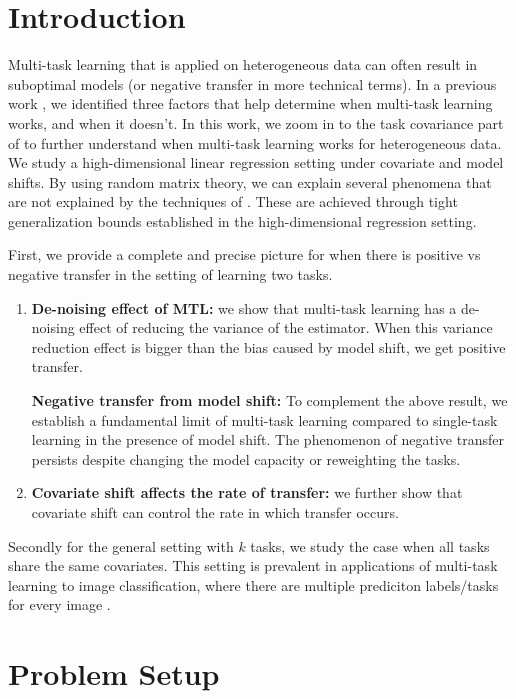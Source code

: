 \section{Introduction}

Multi-task learning that is applied on heterogeneous data can often result in suboptimal models (or negative transfer in more technical terms).
In a previous work \cite{WZR20}, we identified three factors that help determine when multi-task learning works, and when it doesn't.
In this work, we zoom in to the task covariance part of \cite{WZR20} to further understand when multi-task learning works for heterogeneous data.
We study a high-dimensional linear regression setting under covariate and model shifts.
By using random matrix theory, we can explain several phenomena that are not explained by the techniques of \cite{WZR20}.
These are achieved through tight generalization bounds established in the high-dimensional regression setting.

First, we provide a complete and precise picture for when there is positive vs negative transfer in the setting of learning two tasks.
\begin{enumerate}
	\item {\bf De-noising effect of MTL:} we show that multi-task learning has a de-noising effect of reducing the variance of the estimator.
	When this variance reduction effect is bigger than the bias caused by model shift, we get positive transfer.

	{\bf Negative transfer from model shift:} To complement the above result, we establish a fundamental limit of multi-task learning compared to single-task learning in the presence of model shift.
	The phenomenon of negative transfer persists despite changing the model capacity or reweighting the tasks.
	\item {\bf Covariate shift affects the rate of transfer:} we further show that covariate shift can control the rate in which transfer occurs.
\end{enumerate}

Secondly for the general setting with $k$ tasks, we study the case when all tasks share the same covariates.
This setting is prevalent in applications of multi-task learning to image classification, where there are multiple prediciton labels/tasks for every image \cite{EA20}.


\section{Problem Setup}\label{sec_setup}

